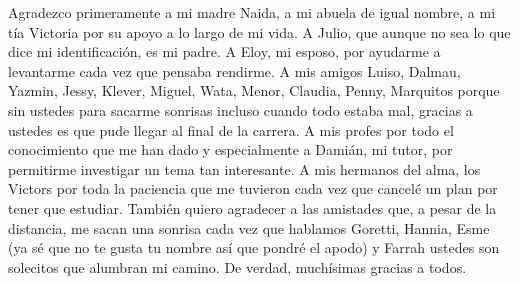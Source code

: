 \begin{acknowledgements}
    Agradezco primeramente a mi madre Naida, a mi abuela de igual nombre, a mi tía Victoria por su apoyo a lo largo de mi vida. A Julio, que aunque no sea lo que dice mi identificación, es mi padre. A Eloy, mi esposo, por ayudarme a levantarme cada vez que pensaba rendirme. A mis amigos Luiso, Dalmau, Yazmin, Jessy, Klever, Miguel, Wata, Menor, Claudia, Penny, Marquitos porque sin ustedes para sacarme sonrisas incluso cuando todo estaba mal, gracias a ustedes es que pude llegar al final de la carrera. A mis profes por todo el conocimiento que me han dado y especialmente a Damián, mi tutor, por permitirme investigar un tema tan interesante. A mis hermanos del alma, los Victors por toda la paciencia que me tuvieron cada vez que cancelé un plan por tener que estudiar. También quiero agradecer a las amistades que, a pesar de la distancia, me sacan una sonrisa cada vez que hablamos Goretti, Hannia, Esme (ya sé que no te gusta tu nombre así que pondré el apodo) y Farrah ustedes son solecitos que alumbran mi camino. De verdad, muchísimas gracias a todos.
\end{acknowledgements}